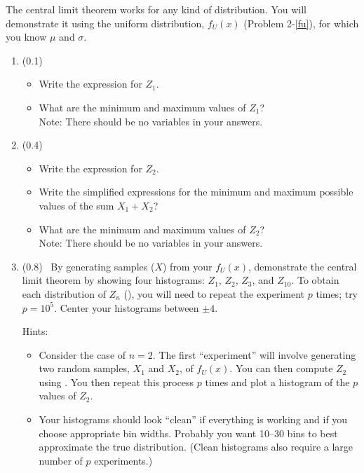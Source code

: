 \documentclass[11pt,titlepage,fleqn]{article}
\begin{document}
\begin{enumerate}
The central limit theorem works for any kind of distribution. You will demonstrate it using the uniform distribution, $f_U(x)$ (Problem 2-\ref{fu}), for which you know $\mu$ and $\sigma$.

\begin{enumerate}

\item (0.1)
\begin{itemize}
\item Write the expression for $Z_1$.
\item What are the minimum and maximum values of $Z_1$? \\
Note: There should be no variables in your answers.
\end{itemize}

\item (0.4)
\begin{itemize}
\item Write the expression for $Z_2$.
\item Write the simplified expressions for the minimum and maximum possible values of the sum $X_1 + X_2$?
\item What are the minimum and maximum values of $Z_2$? \\
Note: There should be no variables in your answers.
\end{itemize}

\item (0.8) \ptag\ By generating samples ($X$) from your $f_U(x)$, demonstrate the central limit theorem by showing four histograms: $Z_1$, $Z_2$, $Z_3$, and $Z_{10}$. To obtain each distribution of $Z_n$ (), you will need to repeat the experiment $p$ times; try $p = 10^5$. Center your histograms between $\pm 4$.

Hints:
\begin{itemize}
\item Consider the case of $n=2$. The first ``experiment'' will involve generating two random samples, $X_1$ and $X_2$, of $f_U(x)$. You can then compute $Z_2$ using . You then repeat this process $p$ times and plot a histogram of the $p$ values of $Z_2$.

\item Your histograms should look ``clean'' if everything is working and if you choose appropriate bin widths. Probably you want 10--30 bins to best approximate the true distribution. (Clean histograms also require a large number of $p$ experiments.)
\end{itemize}

\end{enumerate}

\end{enumerate}
\end{document}
